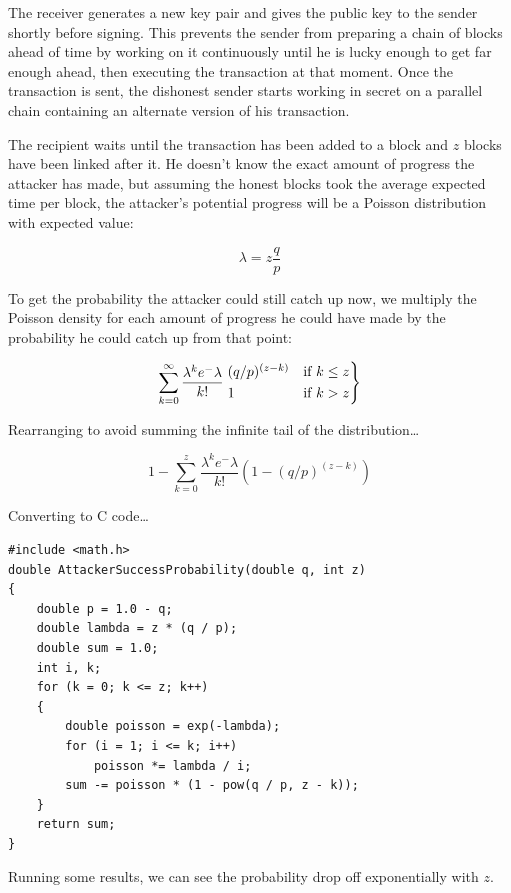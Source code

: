\documentclass[10pt]{book}
\begin{document}
The receiver generates a new key pair and gives the public key to the sender shortly before signing.
This prevents the sender from preparing a chain of blocks ahead of time by working on it continuously until he is lucky enough to get far enough ahead, then executing the transaction at that moment.
Once the transaction is sent, the dishonest sender starts working in secret on a parallel chain containing an alternate version of his transaction.

The recipient waits until the transaction has been added to a block and \(z\) blocks have been linked after it.
He doesn't know the exact amount of progress the attacker has made, but assuming the honest blocks took the average expected time per block, the attacker's potential progress will be a Poisson distribution with expected value:

$$\lambda = z\frac{q}{p} $$

To get the probability the attacker could still catch up now, we multiply the
Poisson density for
each amount of progress he could have made by the probability he could catch
up from that point:

$$\sum_{k=0}^{\infty} \frac{\lambda^k e^-\lambda}{k!} \begin{rcases}(q/p)^{(z-k)} & \text{if}\ k \leq z \\ 1 & \text{if}\ k>z \end{rcases}$$

Rearranging to avoid summing the infinite tail of the distribution\ldots{}

$$1-\sum_{k=0}^{z} \frac{\lambda^k e^-\lambda}{k!} \left(1 - (q/p)^{(z-k)}\right)$$

Converting to C code\ldots{}

\begin{verbatim}
#include <math.h>
double AttackerSuccessProbability(double q, int z)
{
    double p = 1.0 - q;
    double lambda = z * (q / p);
    double sum = 1.0;
    int i, k;
    for (k = 0; k <= z; k++)
    {
        double poisson = exp(-lambda);
        for (i = 1; i <= k; i++)
            poisson *= lambda / i;
        sum -= poisson * (1 - pow(q / p, z - k));
    }
    return sum;
}
\end{verbatim}

Running some results, we can see the probability drop off exponentially with \(z\).
\end{document}
